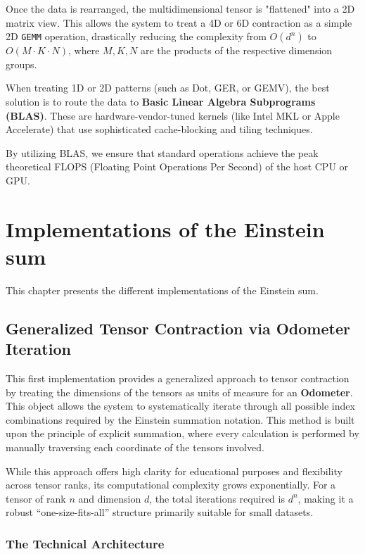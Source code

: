\documentclass[binding=0.6cm]{sapthesis}
\begin{document}
\begin{description}
	      Once the data is rearranged, the multidimensional tensor is "flattened" into a 2D matrix view. This allows the system to treat a 4D or 6D contraction as a simple 2D \texttt{GEMM} operation, drastically reducing the complexity from $O(d^n)$ to $O(M \cdot K \cdot N)$, where $M, K, N$ are the products of the respective dimension groups.

	\item [BLAS Pattern Dispatching:]
	      When treating 1D or 2D patterns (such as Dot, GER, or GEMV), the best solution is to route the data to \textbf{Basic Linear Algebra Subprograms (BLAS)}. These are hardware-vendor-tuned kernels (like Intel MKL or Apple Accelerate) that use sophisticated cache-blocking and tiling techniques.

	      By utilizing BLAS, we ensure that standard operations achieve the peak theoretical FLOPS (Floating Point Operations Per Second) of the host CPU or GPU.
\end{description}

\chapter{Implementations of the Einstein sum}
\label{chap:Implementations}

\noindent This chapter presents the different implementations of the Einstein sum.
\section{Generalized Tensor Contraction via Odometer Iteration}

This first implementation provides a generalized approach to tensor contraction by treating the dimensions of the tensors as units of measure for an \textbf{Odometer}. This object allows the system to systematically iterate through all possible index combinations required by the Einstein summation notation. This method is built upon the principle of explicit summation, where every calculation is performed by manually traversing each coordinate of the tensors involved.

While this approach offers high clarity for educational purposes and flexibility across tensor ranks, its computational complexity grows exponentially. For a tensor of rank $n$ and dimension $d$, the total iterations required is $d^n$, making it a robust ``one-size-fits-all'' structure primarily suitable for small datasets.

\subsection{The Technical Architecture}
\end{document}
